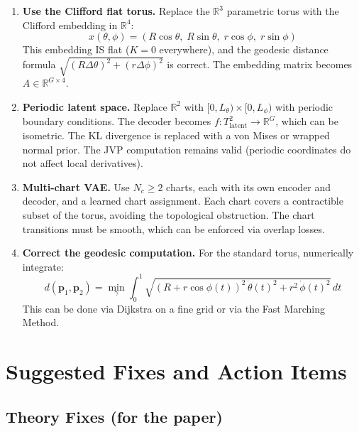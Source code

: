 \documentclass{article}
\begin{document}
\begin{enumerate}
\item \textbf{Use the Clifford flat torus.}
  Replace the $\mathbb{R}^3$ parametric torus with the Clifford embedding
  in $\mathbb{R}^4$:
  \[
    x(\theta, \phi) = (R\cos\theta,\; R\sin\theta,\; r\cos\phi,\; r\sin\phi)
  \]
  This embedding IS flat ($K = 0$ everywhere), and the geodesic distance
  formula $\sqrt{(R\Delta\theta)^2 + (r\Delta\phi)^2}$ is correct.
  The embedding matrix becomes $A \in \mathbb{R}^{G \times 4}$.

\item \textbf{Periodic latent space.}
  Replace $\mathbb{R}^2$ with $[0, L_\theta) \times [0, L_\phi)$ with
  periodic boundary conditions. The decoder becomes
  $f: T^2_{\text{latent}} \to \mathbb{R}^G$, which can be isometric.
  The KL divergence is replaced with a von Mises or wrapped normal prior.
  The JVP computation remains valid (periodic coordinates do not affect
  local derivatives).

\item \textbf{Multi-chart VAE.}
  Use $N_c \geq 2$ charts, each with its own encoder and decoder, and a
  learned chart assignment. Each chart covers a contractible subset of the
  torus, avoiding the topological obstruction. The chart transitions must
  be smooth, which can be enforced via overlap losses.

\item \textbf{Correct the geodesic computation.}
  For the standard torus, numerically integrate:
  \[
    d(\mathbf{p}_1, \mathbf{p}_2) = \min_\gamma \int_0^1
    \sqrt{(R + r\cos\phi(t))^2\,\dot\theta(t)^2 + r^2\,\dot\phi(t)^2}\,dt
  \]
  This can be done via Dijkstra on a fine grid or via the Fast Marching Method.
\end{enumerate}

\section{Suggested Fixes and Action Items}
\label{sec:action_items}

\subsection{Theory Fixes (for the paper)}
\end{document}
